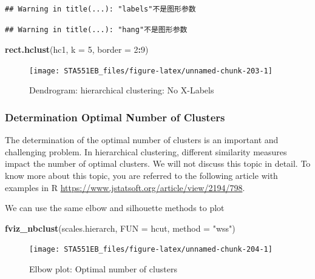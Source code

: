 \documentclass[
]{book}
\newenvironment{Shaded}{\begin{snugshade}}{\end{snugshade}}
\newcommand{\AttributeTok}[1]{\textcolor[rgb]{0.13,0.29,0.53}{#1}}
\newcommand{\DecValTok}[1]{\textcolor[rgb]{0.00,0.00,0.81}{#1}}
\newcommand{\FunctionTok}[1]{\textcolor[rgb]{0.13,0.29,0.53}{\textbf{#1}}}
\newcommand{\NormalTok}[1]{#1}
\newcommand{\SpecialCharTok}[1]{\textcolor[rgb]{0.81,0.36,0.00}{\textbf{#1}}}
\newcommand{\StringTok}[1]{\textcolor[rgb]{0.31,0.60,0.02}{#1}}
\begin{document}
\begin{verbatim}
## Warning in title(...): "labels"不是图形参数
\end{verbatim}

\begin{verbatim}
## Warning in title(...): "hang"不是图形参数
\end{verbatim}

\begin{Shaded}
\begin{Highlighting}[]
\FunctionTok{rect.hclust}\NormalTok{(hc1, }\AttributeTok{k =} \DecValTok{5}\NormalTok{, }\AttributeTok{border =} \DecValTok{2}\SpecialCharTok{:}\DecValTok{9}\NormalTok{)}
\end{Highlighting}
\end{Shaded}

\begin{figure}

{\centering \texttt{[image: STA551EB\_files/figure-latex/unnamed-chunk-203-1]} 

}

\caption{Dendrogram: hierarchical clustering: No X-Labels}\label{fig:unnamed-chunk-203}
\end{figure}

\hypertarget{determination-optimal-number-of-clusters}{%
\subsubsection{Determination Optimal Number of Clusters}\label{determination-optimal-number-of-clusters}}

The determination of the optimal number of clusters is an important and challenging problem. In hierarchical clustering, different similarity measures impact the number of optimal clusters. We will not discuss this topic in detail. To know more about this topic, you are referred to the following article with examples in R \url{https://www.jstatsoft.org/article/view/2194/798}.

We can use the same elbow and silhouette methods to plot

\begin{Shaded}
\begin{Highlighting}[]
\FunctionTok{fviz\_nbclust}\NormalTok{(scales.hierarch, }\AttributeTok{FUN =}\NormalTok{ hcut, }\AttributeTok{method =} \StringTok{"wss"}\NormalTok{)}
\end{Highlighting}
\end{Shaded}

\begin{figure}

{\centering \texttt{[image: STA551EB\_files/figure-latex/unnamed-chunk-204-1]} 

}

\caption{Elbow plot: Optimal number of clusters}\label{fig:unnamed-chunk-204}
\end{figure}
\end{document}
